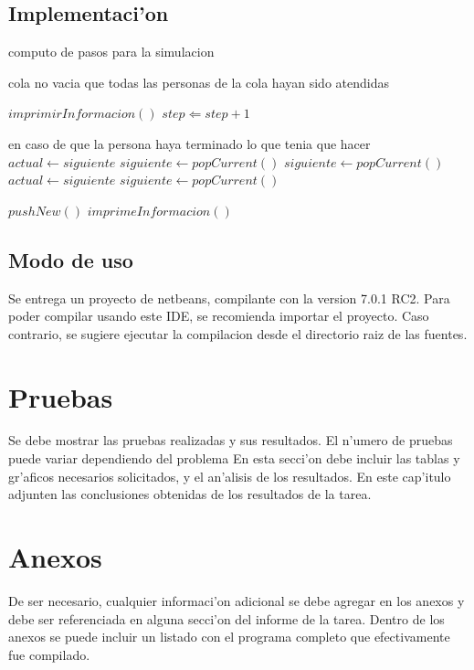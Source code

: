 \documentclass[11pt]{utalcaDoc}
\begin{document}
  \subsection{Implementaci'on}
	\begin{algorithm}[H]                      %
	\caption{computo de pasos para la simulacion}          %
	\label{alg1}                           %
	\begin{algorithmic}                    %
	    \REQUIRE cola no vacia
	    \ENSURE que todas las personas de la cola hayan sido atendidas
	    
	    \STATE $imprimirInformacion()$
	    \STATE $step \Leftarrow step + 1$
	    
	    		\RETURN \FALSE
	    	\ENDIF
	    	\COMMENT en caso de que la persona haya terminado lo que tenia que hacer
	    		\STATE $actual \leftarrow siguiente$
	    		\STATE $siguiente \leftarrow popCurrent()$
	    	\ENDIF
	    		\RETURN \FALSE
	    	\ENDIF
	    \ELSE
	    		\STATE $siguiente \leftarrow popCurrent()$
	    	\ENDIF
		    		\STATE $actual \leftarrow siguiente$
		    		\STATE $siguiente \leftarrow popCurrent()$
	    		\ENDIF
	    	\ENDIF
	    		\RETURN \FALSE
	    	\ENDIF
	    	
	    		\STATE $pushNew()$
	    	\ENDIF
	    \ENDIF
    		\STATE $imprimeInformacion()$
  	 	\ENDIF
		\RETURN \TRUE	
	\end{algorithmic}
	\end{algorithm}
  
  \subsection{Modo de uso} Se entrega un proyecto de netbeans, compilante con la version 7.0.1 RC2. Para poder compilar usando este IDE, se recomienda importar el proyecto. Caso contrario, se sugiere ejecutar la compilacion desde el directorio raiz de las fuentes.

\section{Pruebas} Se debe mostrar las pruebas realizadas y sus resultados.
El n'umero de pruebas puede variar dependiendo del problema
En esta secci'on debe incluir las tablas y gr'aficos necesarios solicitados,
y el an'alisis de los resultados. En este cap'itulo adjunten las conclusiones
obtenidas de los resultados de la tarea.

\section{Anexos} De ser necesario, cualquier informaci'on adicional se debe
agregar en los anexos y debe ser referenciada en alguna secci'on del
informe de la tarea. Dentro de los anexos se puede incluir un listado con
el programa completo que efectivamente fue compilado.
\end{document}
